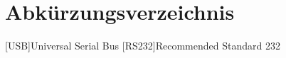 \section*{Abkürzungsverzeichnis}

\begin{acronym}
    [USB]{Universal Serial Bus}
    [RS232]{Recommended Standard 232}
\end{acronym}
